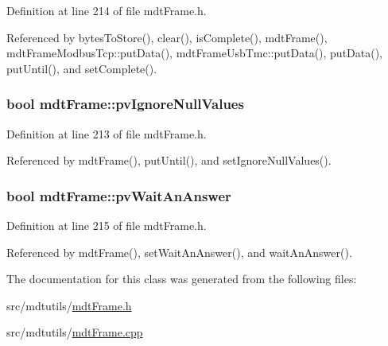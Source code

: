 Definition at line 214 of file mdt\-Frame.\-h.



Referenced by bytes\-To\-Store(), clear(), is\-Complete(), mdt\-Frame(), mdt\-Frame\-Modbus\-Tcp\-::put\-Data(), mdt\-Frame\-Usb\-Tmc\-::put\-Data(), put\-Data(), put\-Until(), and set\-Complete().

\hypertarget{classmdt_frame_a883c4de8f2c961310366d5a72b6e6dd8}{
\subsubsection[{pv\-Ignore\-Null\-Values}]{\setlength{\rightskip}{0pt plus 5cm}bool mdt\-Frame\-::pv\-Ignore\-Null\-Values\hspace{0.3cm}{\ttfamily [protected]}}}\label{classmdt_frame_a883c4de8f2c961310366d5a72b6e6dd8}


Definition at line 213 of file mdt\-Frame.\-h.



Referenced by mdt\-Frame(), put\-Until(), and set\-Ignore\-Null\-Values().

\hypertarget{classmdt_frame_aac030954a872c41f7fb917912e16a77f}{
\subsubsection[{pv\-Wait\-An\-Answer}]{\setlength{\rightskip}{0pt plus 5cm}bool mdt\-Frame\-::pv\-Wait\-An\-Answer\hspace{0.3cm}{\ttfamily [protected]}}}\label{classmdt_frame_aac030954a872c41f7fb917912e16a77f}


Definition at line 215 of file mdt\-Frame.\-h.



Referenced by mdt\-Frame(), set\-Wait\-An\-Answer(), and wait\-An\-Answer().



The documentation for this class was generated from the following files\-:\begin{DoxyCompactItemize}
\item 
src/mdtutils/\hyperlink{mdt_frame_8h}{mdt\-Frame.\-h}\item 
src/mdtutils/\hyperlink{mdt_frame_8cpp}{mdt\-Frame.\-cpp}\end{DoxyCompactItemize}
